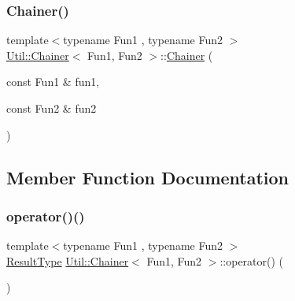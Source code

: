 \mbox{\label{classUtil_1_1Chainer_a326196e6b1b7c50ca66c8930d2274007}} 
\subsubsection{\texorpdfstring{Chainer()}{Chainer()}\hspace{0.1cm}{\footnotesize\ttfamily [3/3]}}
{\footnotesize\ttfamily template$<$typename Fun1 , typename Fun2 $>$ \\
\mbox{\hyperlink{classUtil_1_1Chainer}{Util\+::\+Chainer}}$<$ Fun1, Fun2 $>$\+::\mbox{\hyperlink{classUtil_1_1Chainer}{Chainer}} (\begin{DoxyParamCaption}\item[{const Fun1 \&}]{fun1,  }\item[{const Fun2 \&}]{fun2 }\end{DoxyParamCaption})\hspace{0.3cm}{\ttfamily [inline]}}



\subsection{Member Function Documentation}
\mbox{\label{classUtil_1_1Chainer_a4eac17d2597562e63056bab3e1ab8046}} 
\subsubsection{\texorpdfstring{operator()()}{operator()()}\hspace{0.1cm}{\footnotesize\ttfamily [1/18]}}
{\footnotesize\ttfamily template$<$typename Fun1 , typename Fun2 $>$ \\
\mbox{\hyperlink{classUtil_1_1Chainer_a2c8d88a77b8ba93eb915dc799ddafbb9}{Result\+Type}} \mbox{\hyperlink{classUtil_1_1Chainer}{Util\+::\+Chainer}}$<$ Fun1, Fun2 $>$\+::operator() (\begin{DoxyParamCaption}{ }\end{DoxyParamCaption})\hspace{0.3cm}{\ttfamily [inline]}}

